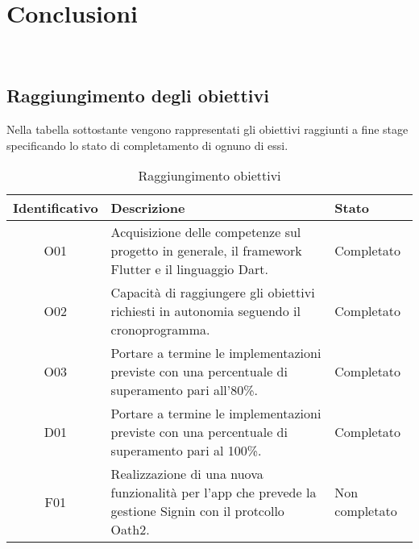 
\chapter{Conclusioni}
\label{cap:conclusioni}

\\

\section{Raggiungimento degli obiettivi}
Nella tabella sottostante vengono rappresentati gli obiettivi raggiunti a fine stage specificando lo stato di completamento di ognuno di essi.\\
\begin{center}
	\begin{table}[h!]
		
		\label{tab:Raggiungimento obiettivi}
		\begin{tabularx}{\textwidth}{|c|p{7cm}|p{2.4cm}|}
			
			\hline
			\textbf{Identificativo} & \centering\textbf{Descrizione} & \textbf{Stato}  \\\hline
			
			O01 & Acquisizione delle competenze sul progetto in generale, il framework Flutter e il linguaggio Dart.  & Completato\\
			\hline
			O02 & Capacità di raggiungere gli obiettivi richiesti in autonomia seguendo il cronoprogramma.  & Completato\\
			\hline	
			O03 & Portare a termine le implementazioni previste con una percentuale di superamento pari all’80\%.  & Completato\\
			\hline
			D01 & Portare a termine le implementazioni previste con una percentuale di superamento pari al 100\%.  & Completato\\
			\hline
			F01 & Realizzazione di una nuova funzionalità per l'app che prevede la gestione Signin con il protcollo Oath2. & Non completato\\
			\hline		
		\end{tabularx}
		\vspace{0.3cm}
		\caption{Raggiungimento obiettivi}
	\end{table}
\end{center}

